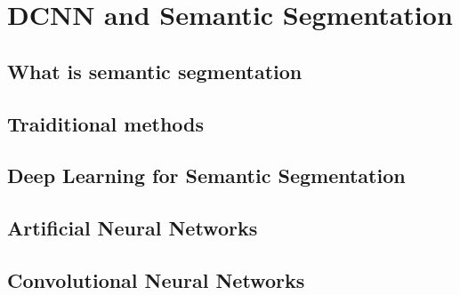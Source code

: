 
\chapter{DCNN and Semantic Segmentation}

\section{What is semantic segmentation}

\section{Traiditional methods}

\section{Deep Learning for Semantic Segmentation}

\section{Artificial Neural Networks}

\section{Convolutional Neural Networks}